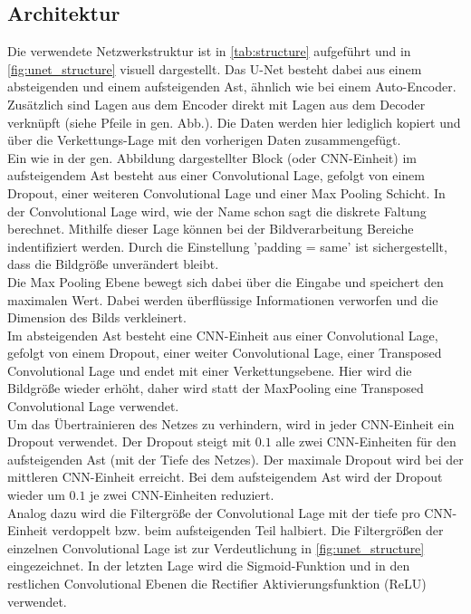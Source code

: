 \subsection{Architektur}
Die verwendete Netzwerkstruktur ist in \autoref{tab:structure} aufgeführt und in \autoref{fig:unet_structure} visuell dargestellt.
Das U-Net besteht dabei aus einem absteigenden und einem aufsteigenden Ast, ähnlich wie bei einem Auto-Encoder.
Zusätzlich sind Lagen aus dem Encoder direkt mit Lagen aus dem Decoder verknüpft (siehe Pfeile in gen. Abb.).
Die Daten werden hier lediglich kopiert und über die Verkettungs-Lage mit den vorherigen Daten zusammengefügt.
\\
Ein wie in der gen. Abbildung dargestellter Block (oder CNN-Einheit) im aufsteigendem Ast besteht aus einer Convolutional Lage, gefolgt von einem Dropout, einer weiteren Convolutional Lage und einer Max Pooling Schicht.
In der Convolutional Lage wird, wie der Name schon sagt die diskrete Faltung berechnet.
Mithilfe dieser Lage können bei der Bildverarbeitung Bereiche indentifiziert werden.
Durch die Einstellung 'padding = same' ist sichergestellt, dass die Bildgröße unverändert bleibt.
\\
Die Max Pooling Ebene bewegt sich dabei über die Eingabe und speichert den maximalen Wert.
Dabei werden überflüssige Informationen verworfen und die Dimension des Bilds verkleinert.
\\
Im absteigenden Ast besteht eine CNN-Einheit aus einer Convolutional Lage, gefolgt von einem Dropout, einer weiter Convolutional Lage, einer Transposed Convolutional Lage und endet mit einer Verkettungsebene.
Hier wird die Bildgröße wieder erhöht, daher wird statt der MaxPooling eine Transposed Convolutional Lage verwendet.
\\
Um das Übertrainieren des Netzes zu verhindern, wird in jeder CNN-Einheit ein Dropout verwendet.
Der Dropout steigt mit $0.1$ alle zwei CNN-Einheiten für den aufsteigenden Ast (mit der Tiefe des Netzes).
Der maximale Dropout wird bei der mittleren CNN-Einheit erreicht.
Bei dem aufsteigendem Ast wird der Dropout wieder um $0.1$ je zwei CNN-Einheiten reduziert.
\\
Analog dazu wird die Filtergröße der Convolutional Lage mit der tiefe pro CNN-Einheit verdoppelt bzw. beim aufsteigenden Teil halbiert.
Die Filtergrößen der einzelnen Convolutional Lage ist zur Verdeutlichung in \autoref{fig:unet_structure} eingezeichnet.
In der letzten Lage wird die Sigmoid-Funktion und in den restlichen Convolutional Ebenen die Rectifier Aktivierungsfunktion (ReLU) verwendet.
